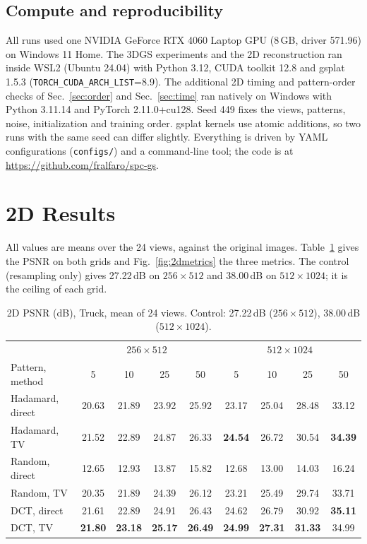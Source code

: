 \documentclass[conference]{IEEEtran}
\begin{document}
\subsection{Compute and reproducibility}
All runs used one NVIDIA GeForce RTX 4060 Laptop GPU (8\,GB, driver 571.96) on Windows 11 Home. The 3DGS experiments and the
2D reconstruction ran inside WSL2 (Ubuntu 24.04) with Python 3.12, CUDA toolkit 12.8 and gsplat 1.5.3
(\texttt{TORCH\_CUDA\_ARCH\_LIST}=8.9). The additional 2D timing and pattern-order checks of Sec.~\ref{sec:order} and
Sec.~\ref{sec:time} ran natively on Windows with Python 3.11.14 and PyTorch 2.11.0+cu128. Seed 449 fixes the views, patterns,
noise, initialization and training order. gsplat kernels use atomic additions, so two runs with the same seed can differ
slightly. Everything is driven by YAML configurations (\texttt{configs/}) and a command-line tool; the code is at
\url{https://github.com/fralfaro/spc-gs}.

\section{2D Results}
\label{sec:2d}
All values are means over the 24 views, against the original images. Table~\ref{tab:psnr2d} gives the PSNR on both grids
and Fig.~\ref{fig:2dmetrics} the three metrics. The control (resampling only) gives 27.22\,dB on $256\times512$ and
38.00\,dB on $512\times1024$; it is the ceiling of each grid.

\begin{table}[t]
\caption{2D PSNR (dB), Truck, mean of 24 views. Control: 27.22\,dB ($256\times512$), 38.00\,dB ($512\times1024$).}
\label{tab:psnr2d}
\centering
\footnotesize
\setlength{\tabcolsep}{3pt}
\begin{tabular}{lcccc|cccc}
\toprule
 & \multicolumn{4}{c|}{$256\times512$} & \multicolumn{4}{c}{$512\times1024$}\\
Pattern, method & 5 & 10 & 25 & 50 & 5 & 10 & 25 & 50 \\
\midrule
Hadamard, direct & 20.63 & 21.89 & 23.92 & 25.92 & 23.17 & 25.04 & 28.48 & 33.12 \\
Hadamard, TV & 21.52 & 22.89 & 24.87 & 26.33 & \textbf{24.54} & 26.72 & 30.54 & \textbf{34.39} \\
Random, direct & 12.65 & 12.93 & 13.87 & 15.82 & 12.68 & 13.00 & 14.03 & 16.24 \\
Random, TV & 20.35 & 21.89 & 24.39 & 26.12 & 23.21 & 25.49 & 29.74 & 33.71 \\
DCT, direct & 21.61 & 22.89 & 24.91 & 26.43 & 24.62 & 26.79 & 30.92 & \textbf{35.11} \\
DCT, TV & \textbf{21.80} & \textbf{23.18} & \textbf{25.17} & \textbf{26.49} & \textbf{24.99} & \textbf{27.31} & \textbf{31.33} & 34.99 \\
\bottomrule
\end{tabular}
\end{table}
\end{document}
